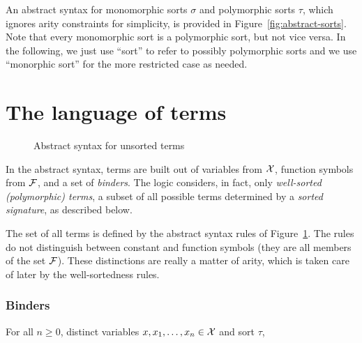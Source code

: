An abstract syntax for monomorphic sorts $\sigma$ and polymorphic sorts $\tau$,
which ignores arity constraints for simplicity, 
is provided in Figure~\ref{fig:abstract-sorts}.
Note that every monomorphic sort is a polymorphic sort, but not vice versa.
In the following, we just use ``sort'' to refer to possibly polymorphic sorts
and we use ``monorphic sort'' for the more restricted case as needed.

%



\section{The language of terms} \label{sec:language}

\begin{figure}
\terms
\caption{Abstract syntax for unsorted terms}
\label{fig:abstract-terms}
\end{figure}

In the abstract syntax,
terms are built out of variables from $\mathcal{X}$, 
function symbols from $\mathcal{F}$, 
and a set of \emph{binders}.
%
The logic considers, in fact, only \emph{well-sorted (polymorphic) terms},
a subset of all possible terms determined 
by a \emph{sorted signature}, as described below.

The set of all terms is defined by the abstract syntax rules of 
Figure~\ref{fig:abstract-terms}.
The rules do not distinguish between constant and function symbols
(they are all members of the set $\mathcal{F}$). 
These distinctions are really a matter of arity, 
which is taken care of later by the well-sortedness rules.

\subsubsection{Binders}

For all $n \geq 0$,
distinct variables $x, x_1, \ldots, x_n \in \mathcal{X}$ and sort $\tau$,

